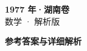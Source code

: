 \documentclass[zihao=-4, a4paper]{ctexart}
\begin{document}
\begin{center}
  {\Large\bfseries 1977 年·湖南卷}\\[4pt]
  {\large 数学 · 解析版}
\end{center}
\medskip
{}

\clearpage
{}
\begin{center}{\Large\bfseries 参考答案与详细解析}\end{center}
\medskip

\end{document}
